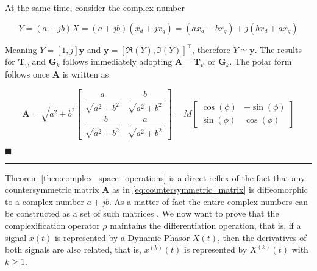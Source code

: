 	At the same time, consider the complex number

\begin{equation} Y = \left(a + jb\right) X = \left(a + jb\right)\left(x_d + jx_q\right) = \left(ax_d - bx_q\right) + j\left(bx_d + ax_q \right) \end{equation}

	Meaning $Y = \left[1,j\right] \mathbf{y}$ and $\mathbf{y} = \left[\Re\left(Y\right),\Im\left(Y\right)\right]^\intercal$, therefore $Y \simeq  \mathbf{y}$. The results for $\mathbf{T}_{\psi}$ and $\mathbf{G}_k$ follows immediately adopting $\mathbf{A} = \mathbf{T}_{\psi}$ or $\mathbf{G}_k$. The polar form follows once $\mathbf{A}$ is written as

\begin{equation} \mathbf{A} = \sqrt{a^2 + b^2} \left[\begin{array}{cc} \dfrac{a}{\sqrt{a^2+b^2}} & \dfrac{b}{\sqrt{a^2+b^2}} \\[5mm] \dfrac{-b}{\sqrt{a^2+b^2}} & \dfrac{a}{\sqrt{a^2+b^2}} \end{array}\right] = M\left[\begin{array}{cc} \cos\left(\phi\right) & -\sin\left(\phi\right) \\[3mm] \sin\left(\phi\right) & \cos\left(\phi\right) \end{array}\right]  \end{equation}

\hfill$\blacksquare$

\vspace{5mm}
\hrule
\vspace{5mm}

	Theorem \ref{theo:complex_space_operations} is a direct reflex of the fact that any countersymmetric matrix $\mathbf{A}$ as in \eqref{eq:countersymmetric_matrix} is diffeomorphic to a complex number $a + jb$. As a matter of fact the entire complex numbers can be constructed as a set of such matrices . We now want to prove that the complexification operator $\rho$ maintains the differentiation operation, that is, if a signal $x(t)$ is represented by a Dynamic Phasor $X(t)$, then the derivatives of both signals are also related, that is, $x^{(k)}(t)$ is represented by $X^{(k)}(t)$ with $k\geq 1$.


